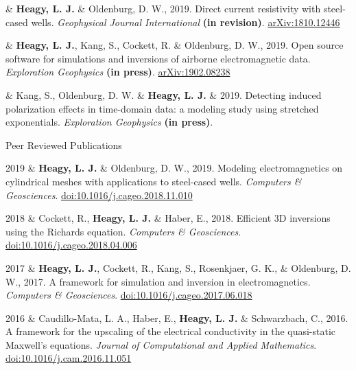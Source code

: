\documentclass[a4paper, 11pt]{article}
\newcommand{\arxiv}[1]{\href{https://arxiv.org/abs/#1}{arXiv:#1}}
\newcommand{\doi}[1]{\href{https://doi.org/#1}{doi:#1}}
\newcommand{\subheading}[1]{
    \vspace{0.3cm}
    {%
    \Large
    #1}\\
    \vspace{0.0cm}
}
\begin{document}
\begin{entryright}
& \textbf{Heagy, L. J.} \& Oldenburg, D. W., 2019. Direct current resistivity with steel-cased wells. \emph{Geophysical Journal International} \textbf{(in revision)}. \arxiv{1810.12446}
\end{entryright}

\begin{entryright}
& \textbf{Heagy, L. J.}, Kang, S., Cockett, R. \& Oldenburg, D. W., 2019. Open source software for simulations and inversions of airborne electromagnetic data. \emph{Exploration Geophysics} \textbf{(in press)}. \arxiv{1902.08238}
\end{entryright}

\begin{entryright}
& Kang, S., Oldenburg, D. W. \& \textbf{Heagy, L. J.} \& 2019. Detecting induced polarization effects in time-domain data: a modeling study using stretched exponentials. \emph{Exploration Geophysics} \textbf{(in press)}.
\end{entryright}


\subheading{Peer Reviewed Publications}

\begin{entryright}
2019 & \textbf{Heagy, L. J.} \& Oldenburg, D. W., 2019. Modeling electromagnetics on cylindrical meshes with applications to steel-cased wells. \emph{Computers \& Geosciences}. \doi{10.1016/j.cageo.2018.11.010}
\end{entryright}

\begin{entryright}
2018 & Cockett, R., \textbf{Heagy, L. J.} \& Haber, E., 2018. Efficient 3D inversions using the Richards equation. \emph{Computers \& Geosciences}. \doi{10.1016/j.cageo.2018.04.006}
\end{entryright}

\begin{entryright}
2017 & \textbf{Heagy, L. J.}, Cockett, R., Kang, S., Rosenkjaer, G. K., \& Oldenburg, D. W., 2017. A framework for simulation and inversion in electromagnetics. \emph{Computers \& Geosciences}. \doi{10.1016/j.cageo.2017.06.018}
\end{entryright}

\begin{entryright}
2016 & Caudillo-Mata, L. A., Haber, E., \textbf{Heagy, L. J.} \& Schwarzbach, C., 2016. A framework for the upscaling of the electrical conductivity in the quasi-static Maxwell’s equations. \emph{Journal of Computational and Applied Mathematics}. \doi{10.1016/j.cam.2016.11.051}
\end{entryright}
\end{document}
